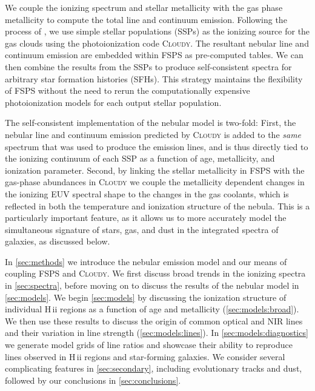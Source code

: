\documentclass[linenumbers, tighten, trackchanges]{aastex61}%
\newcommand{\Sec}[1]{\autoref{sec:#1}}
\newcommand{\FSPS}{{\sc FSPS}\xspace}
\newcommand{\Cloudy}{\textsc{Cloudy}\xspace}
\newcommand{\hii}{H\,{\sc ii}\xspace}
\begin{document}
We couple the ionizing spectrum and stellar metallicity with the gas phase metallicity to  compute the total line and continuum emission. Following the process of \citet{CL01}, we use simple stellar populations (SSPs) as the ionizing source for the gas clouds using the photoionization code \Cloudy {}. The resultant nebular line and continuum emission are embedded within \FSPS as pre-computed tables. We can then combine the results from the SSPs to produce self-consistent spectra for arbitrary star formation histories (SFHs). This strategy maintains the flexibility of \FSPS without the need to rerun the computationally expensive photoionization models for each output stellar population.

The self-consistent implementation of the nebular model is two-fold: First, the nebular line and continuum emission predicted by \Cloudy is added to the \emph{same} spectrum that was used to produce the emission lines, and is thus directly tied to the ionizing continuum of each SSP as a function of age, metallicity, and ionization parameter. Second, by linking the stellar metallicity in \FSPS with the gas-phase abundances in \Cloudy we couple the metallicity dependent changes in the ionizing EUV spectral shape to the changes in the gas coolants, which is reflected in both the temperature and ionization structure of the nebula. This is a particularly important feature, as it allows us to more accurately model the simultaneous signature of stars, gas, and dust in the integrated spectra of galaxies, as discussed below. 

In \Sec{methods} we introduce the nebular emission model and our means of coupling \FSPS and \Cloudy. We first discuss broad trends in the ionizing spectra in \Sec{spectra}, before moving on to discuss the results of the nebular model in \Sec{models}. We begin \Sec{models} by discussing the ionization structure of individual \hii regions as a function of age and metallicity (\Sec{models:broad}). We then use these results to discuss the origin of common optical and NIR lines and their variation in line strength (\Sec{models:lines}). In \Sec{models:diagnostics} we generate model grids of line ratios and showcase their ability to reproduce lines observed in \hii regions and star-forming galaxies. We consider several complicating features in \Sec{secondary}, including  evolutionary tracks and dust, followed by our conclusions in \Sec{conclusions}.
\end{document}
